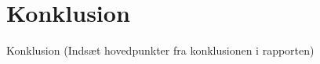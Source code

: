 \section{Konklusion}

\begin{frame}{Konklusion}
(Indsæt hovedpunkter fra konklusionen i rapporten)
\end{frame}